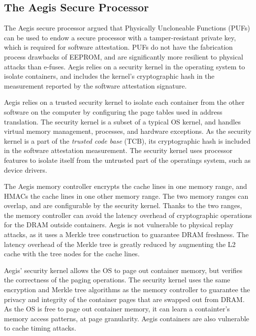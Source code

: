 \subsection{The Aegis Secure Processor}

The Aegis secure processor \cite{suh2003aegis} argued that Physically
Uncloneable Functions (PUFs) \cite{gassend2002puf} can be used to endow a
secure processor with a tamper-resistant private key, which is required for
software attestation. PUFs do not have the fabrication process drawbacks of
EEPROM, and are significantly more resilient to physical attacks than e-fuses.
Aegis relies on a security kernel in the operating system to isolate
containers, and includes the kernel's cryptographic hash in the measurement
reported by the software attestation signature.

Aegis relies on a trusted security kernel to isolate each container from the
other software on the computer by configuring the page tables used in address
translation. The security kernel is a subset of a typical OS kernel, and
handles virtual memory management, processes, and hardware exceptions. As the
security kernel is a part of the \textit{trusted code base} (TCB), its
cryptographic hash is included in the software attestation measurement. The
security kernel uses processor features to isolate itself from the untrusted
part of the operatings system, such as device drivers.

The Aegis memory controller encrypts the cache lines in one memory range, and
HMACs the cache lines in one other memory range. The two memory ranges can
overlap, and are configurable by the security kernel. Thanks to the two ranges,
the memory controller can avoid the latency overhead of cryptographic
operations for the DRAM outside containers. Aegis is not vulnerable to physical
replay attacks, as it uses a Merkle tree construction \cite{gassend2003merkle}
to guarantee DRAM freshness. The latency overhead of the Merkle tree is greatly
reduced by augmenting the L2 cache with the tree nodes for the cache lines.

Aegis' security kernel allows the OS to page out container memory, but verifies
the correctness of the paging operations. The security kernel uses the same
encryption and Merkle tree algorithms as the memory controller to guarantee the
privacy and integrity of the container pages that are swapped out from DRAM.
As the OS is free to page out container memory, it can learn a containter's
memory access patterns, at page granularity. Aegis containers are also
vulnerable to cache timing attacks.
